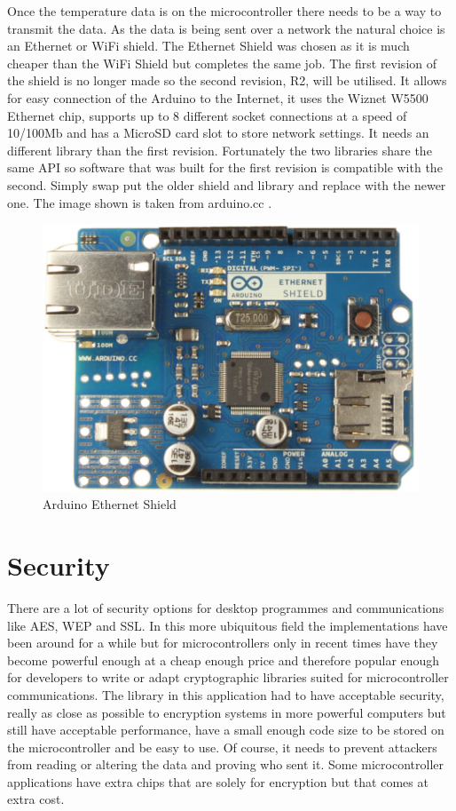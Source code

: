 Once the temperature data is on the microcontroller there needs to be a way to transmit the data. As the data is being sent over a network the natural choice is an Ethernet or WiFi shield. The Ethernet Shield was chosen as it is much cheaper than the WiFi Shield but completes the same job. The first revision of the shield is no longer made so the second revision, R2, will be utilised. It allows for easy connection of the Arduino to the Internet, it uses the Wiznet W5500 Ethernet chip, supports up to 8 different socket connections at a speed of 10/100Mb and has a MicroSD card slot to store network settings. It needs an different library than the first revision\cite{eth2}. Fortunately the two libraries share the same API so software that was built for the first revision is compatible with the second. Simply swap put the older shield and library and replace with the newer one. The image shown is taken from arduino.cc \cite{ethimage}.

\begin{figure}[H]
	\centering
	\includegraphics[width=.4\linewidth]{Figures/ethernet.jpg}
	\caption{Arduino Ethernet Shield}
	\label{fig:eth}
\end{figure}

\section{Security}

There are a lot of security options for desktop programmes and communications like AES, WEP and SSL. In this more ubiquitous field the implementations have been around for a while but for microcontrollers only in recent times have they become powerful enough at a cheap enough price and therefore popular enough for developers to write or adapt cryptographic libraries suited for microcontroller communications. The library in this application had to have acceptable security, really as close as possible to encryption systems in more powerful computers but still have acceptable performance, have a small enough code size to be stored on the microcontroller and be easy to use. Of course, it needs to prevent attackers from reading or altering the data and proving who sent it. Some microcontroller applications have extra chips that are solely for encryption but that comes at extra cost.

